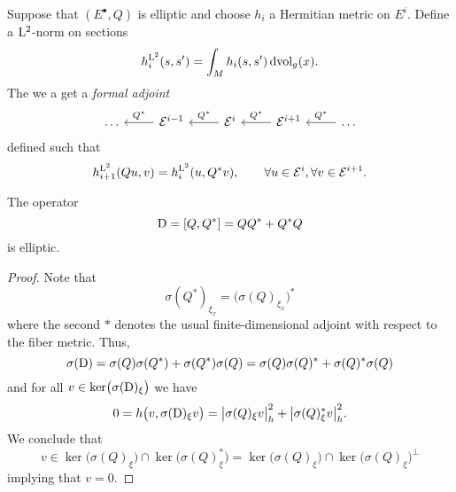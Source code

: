 Suppose that $(E^\bullet, Q)$ is elliptic and choose $h_i$ a Hermitian metric on $E^i$.
Define a $\mathrm{L}^2$-norm on sections
\begin{equation*}
  h_i^{\mathrm{L}^2}(s, s')
  = \int_M h_i (s, s') \, \mathrm{d} \text{vol}_g (x).
\end{equation*}
The we a get a \textit{formal adjoint}
\begin{equation*}
  \begin{tikzcd}
    \dots &
    \Ecal^{i-1} \arrow[l, swap, "Q^*"] &
    \Ecal^{i} \arrow[l, swap, "Q^*"] &
    \Ecal^{i+1} \arrow[l, swap, "Q^*"] &
    \dots \arrow[l, swap, "Q^*"]
  \end{tikzcd}
\end{equation*}
defined such that
\begin{equation*}
  h_{i+1}^{\mathrm{L}^2}(Q u, v) = h_i^{\mathrm{L}^2} (u, Q^* v), \qquad
  \forall u \in \mathcal{E}^{i}, \forall v \in \mathcal{E}^{i+1}.
\end{equation*}

\begin{lemma}
  The operator
  \begin{equation*}
    \mathrm{D} = [Q, Q^*] = Q Q^* + Q^* Q
  \end{equation*}
  is elliptic.
\end{lemma}
\begin{proof}
  Note that
  \begin{equation*}
    \sigma(Q^*)_{\xi_x} = \bigl( \sigma(Q)_{\xi_x} \bigr)^*
  \end{equation*}
  where the second $*$ denotes the usual finite-dimensional adjoint with respect to the fiber metric.
  Thus,
  \begin{equation*}
    \sigma(\mathrm{D})
    = \sigma(Q) \sigma(Q^*) + \sigma(Q^*) \sigma(Q) \\
    = \sigma(Q) \sigma(Q)^* + \sigma(Q)^* \sigma(Q)
  \end{equation*}
  and for all $v \in \ker \bigl( \sigma(\mathrm{D})_\xi \bigr)$ we have
  \begin{equation*}
    0 = h\bigl(v, \sigma(\mathrm{D})_\xi v \bigr)
    = \bigl| \sigma(Q)_\xi  v \bigr|_h^2 + \bigl| \sigma(Q)_\xi^* v \bigr|_h^2.
  \end{equation*}
  We conclude that
  \begin{equation*}
    v \in \ker \bigl( \sigma(Q)_\xi \bigr) \cap
    \ker \bigl( \sigma(Q)_\xi^* \bigr)
    = \ker \bigl( \sigma(Q)_\xi \bigr) \cap
    \ker \bigl( \sigma(Q)_\xi \bigr)^\perp
  \end{equation*}
  implying that $v = 0$.
\end{proof}
